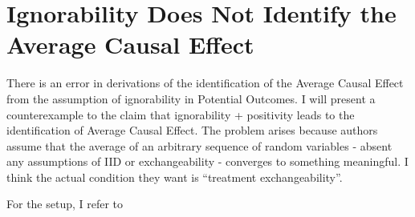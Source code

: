 

\section{Ignorability Does Not Identify the Average Causal Effect}

There is an error in derivations of the identification of the Average Causal Effect from the assumption of ignorability in Potential Outcomes. I will present a counterexample to the claim that ignorability + positivity leads to the identification of Average Causal Effect. The problem arises because authors assume that the average of an arbitrary sequence of random variables - absent any assumptions of IID or exchangeability - converges to something meaningful. I think the actual condition they want is ``treatment exchangeability''.

For the setup, I refer to \citet{angrist_mastering_2014} 

